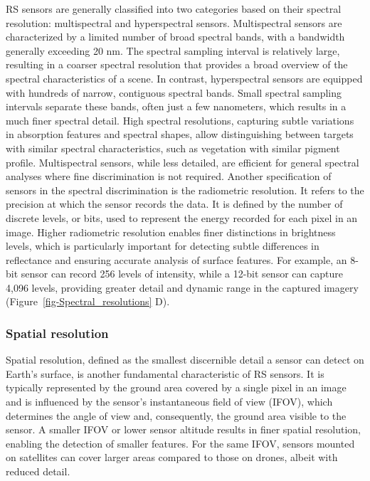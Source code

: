 \documentclass[
  letterpaper,
  11pt,
  english,
  singlespacing,
  headsepline]{MastersDoctoralThesis}
\begin{document}
\begin{spacing}{1.5}
\begin{figure}
\end{figure}%

RS sensors are generally classified into two categories based on their
spectral resolution: multispectral and hyperspectral sensors.
Multispectral sensors are characterized by a limited number of broad
spectral bands, with a bandwidth generally exceeding 20 nm. The spectral
sampling interval is relatively large, resulting in a coarser spectral
resolution that provides a broad overview of the spectral
characteristics of a scene. In contrast, hyperspectral sensors are
equipped with hundreds of narrow, contiguous spectral bands. Small
spectral sampling intervals separate these bands, often just a few
nanometers, which results in a much finer spectral detail. High spectral
resolutions, capturing subtle variations in absorption features and
spectral shapes, allow distinguishing between targets with similar
spectral characteristics, such as vegetation with similar pigment
profile. Multispectral sensors, while less detailed, are efficient for
general spectral analyses where fine discrimination is not required.
Another specification of sensors in the spectral discrimination is the
radiometric resolution. It refers to the precision at which the sensor
records the data. It is defined by the number of discrete levels, or
bits, used to represent the energy recorded for each pixel in an image.
Higher radiometric resolution enables finer distinctions in brightness
levels, which is particularly important for detecting subtle differences
in reflectance and ensuring accurate analysis of surface features. For
example, an 8-bit sensor can record 256 levels of intensity, while a
12-bit sensor can capture 4,096 levels, providing greater detail and
dynamic range in the captured imagery
(Figure~\ref{fig-Spectral_resolutions} D).

\subsubsection{Spatial resolution}\label{spatial-resolution}

Spatial resolution, defined as the smallest discernible detail a sensor
can detect on Earth's surface, is another fundamental characteristic of
RS sensors. It is typically represented by the ground area covered by a
single pixel in an image and is influenced by the sensor's instantaneous
field of view (IFOV), which determines the angle of view and,
consequently, the ground area visible to the sensor. A smaller IFOV or
lower sensor altitude results in finer spatial resolution, enabling the
detection of smaller features. For the same IFOV, sensors mounted on
satellites can cover larger areas compared to those on drones, albeit
with reduced detail.


\end{spacing}
\end{document}
